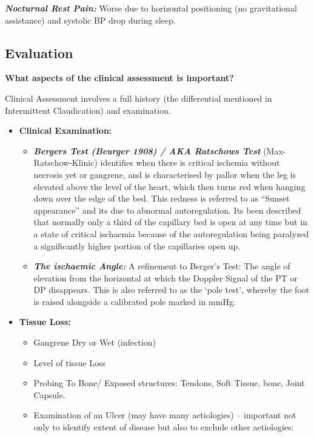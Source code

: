 \documentclass[
]{book}
\begin{document}
\textbf{\emph{Nocturnal Rest Pain:}} Worse due to horizontal positioning (no
gravitational assistance) and systolic BP drop during sleep.

\hypertarget{evaluation-12}{%
\subsection{Evaluation}\label{evaluation-12}}

\textbf{What aspects of the clinical assessment is important?}

Clinical Assessment involves a full history (the differential mentioned
in Intermittent Claudication) and examination.

\begin{itemize}
\item
  \textbf{Clinical Examination:}

  \begin{itemize}
  \item
    \textbf{\emph{Bergers Test (Beurger 1908) / AKA Ratschows Test}}
    (Max-Ratschow-Klinic) identifies when there is critical ischemia
    without necrosis yet or gangrene, and is characterised by pallor
    when the leg is elevated above the level of the heart, which
    then turns red when hanging down over the edge of the bed. This
    redness is referred to as ``Sunset appearance'' and its due to
    abnormal autoregulation. Its been described that normally only a
    third of the capillary bed is open at any time but in a state of
    critical ischaemia because of the autoregulation being paralyzed
    a significantly higher portion of the capillaries open up.
  \item
    \textbf{\emph{The ischaemic Angle:}} A refinement to Berger's Test: The angle of
    elevation from the horizontal at which the Doppler Signal of the
    PT or DP disappears. This is also referred to as the `pole
    test', whereby the foot is raised alongside a calibrated pole
    marked in mmHg.
  \end{itemize}
\item
  \textbf{Tissue Loss:}

  \begin{itemize}
  \item
    Gangrene Dry or Wet (infection)
  \item
    Level of tissue Loss
  \item
    Probing To Bone/ Exposed structures: Tendons, Soft Tissue, bone,
    Joint Capsule.
  \item
    Examination of an Ulcer (may have many aetiologies) -- important
    not only to identify extent of disease but also to exclude other
    aetiologies:


\end{itemize}
\end{itemize}
\end{document}
